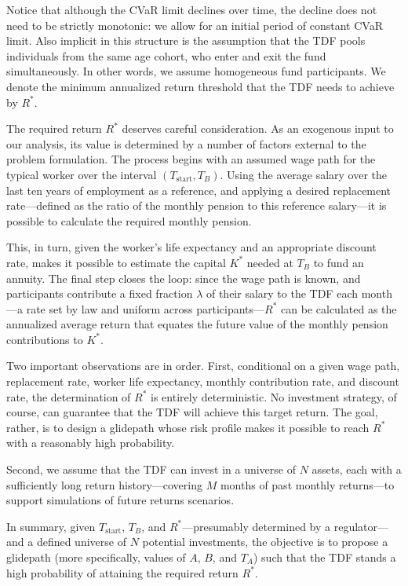 \documentclass[11pt]{article}
\newcommand{\Rstar}{R^{*}}
\newcommand{\Kstar}{K^{*}}
\newcommand{\Tstart}{T_{\mathrm{start}}}
\newcommand{\TA}{T_{A}}
\newcommand{\TB}{T_{B}}
\begin{document}
Notice that although the CVaR limit declines over time, the decline does not need to be strictly monotonic: we allow for an initial period of constant CVaR limit. Also implicit in this structure is the assumption that the TDF pools individuals from the same age cohort, who enter and exit the fund simultaneously. In other words, we assume homogeneous fund participants. We denote the minimum annualized return threshold
that the TDF needs to achieve by $R^*$.

The required return $\Rstar$ deserves careful consideration. As an exogenous input to our analysis, its value is determined by a number of factors external to the problem formulation. The process begins with an assumed wage path for the typical worker over the interval $(\Tstart,\TB)$. Using the average salary over the last ten years of employment as a reference, and applying a desired replacement rate---defined as the ratio of the monthly pension to this reference salary---it is possible to calculate the required monthly pension.

This, in turn, given the worker's life expectancy and an appropriate discount rate, makes it possible to estimate the capital $\Kstar$ needed at $\TB$ to fund an annuity. The final step closes the loop: since the wage path is known, and participants contribute a fixed fraction $\lambda$ of their salary to the TDF each month---a rate set by law and uniform across participants---$\Rstar$ can be calculated as the annualized average return that equates the future value of the monthly pension contributions to $\Kstar$.

Two important observations are in order. First, conditional on a given wage path, replacement rate, worker life expectancy, monthly contribution rate, and discount rate, the determination of $\Rstar$ is entirely deterministic. No investment strategy, of course, can guarantee that the TDF will achieve this target return. The goal, rather, is to design a glidepath whose risk profile makes it possible to reach $\Rstar$ with a reasonably high probability.

Second, we assume that the TDF can invest in a universe of $N$ assets, each with a sufficiently long return history---covering $M$ months of past monthly returns---to support simulations of future returns scenarios.

In summary, given $\Tstart$, $\TB$, and $\Rstar$---presumably determined by a regulator---and a defined universe of $N$ potential investments, the objective is to propose a glidepath (more specifically, values of $A$, $B$, and $\TA$) such that the TDF stands a high probability of attaining the required return $\Rstar$.
\end{document}
